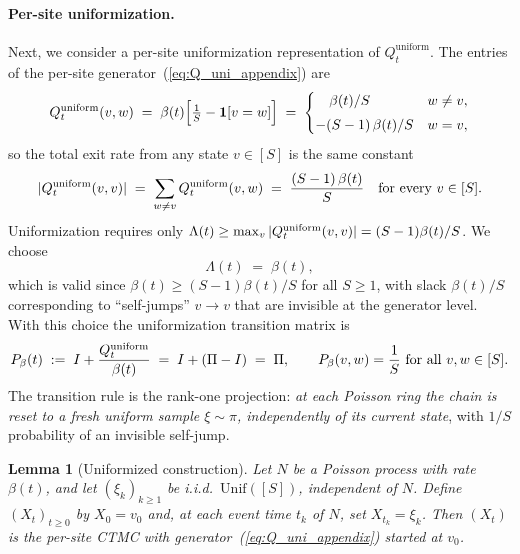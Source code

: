 \documentclass{article} %
\newtheorem{lemma}[theorem]{Lemma}
\def\eqref#1{equation~\ref{#1}}
\renewcommand{\eqref}[1]{\textup{(\ref{#1})}}
\newcommand{\Punif}{\Pi}
\begin{document}
\paragraph{Per-site uniformization.} Next, we consider a per-site uniformization representation of $Q^\mathrm{uniform}_t$. The entries of the per-site generator~\eqref{eq:Q_uni_appendix} are
\begin{equation}\label{eq:Q_entries}
  Q_t^{\rm uniform}(v, w) \;=\; \beta(t)\Big[\tfrac{1}{S} - \mathbf{1}[v=w]\Big]
  \;=\;
  \begin{cases}
    \;\;\;\,\beta(t)/S & w \neq v, \\[3pt]
    -(S-1)\,\beta(t)/S & w = v,
  \end{cases}
\end{equation}
so the total exit rate from any state $v \in [S]$ is the same constant
\begin{equation}\label{eq:exit_rate}
  |Q_t^{\rm uniform}(v,v)|
  \;=\; \sum_{w \neq v} Q_t^{\rm uniform}(v, w)
  \;=\; \frac{(S-1)\,\beta(t)}{S}
  \quad\text{for every } v \in [S].
\end{equation}
Uniformization requires only
$\Lambda(t) \ge \max_v |Q_t^{\rm uniform}(v,v)| = (S-1)\beta(t)/S$.
We choose
\begin{equation}\label{eq:choice_lambda}
  \Lambda(t) \;=\; \beta(t),
\end{equation}
which is valid since $\beta(t) \ge (S-1)\beta(t)/S$ for all $S \ge 1$,
with slack $\beta(t)/S$ corresponding to ``self-jumps'' $v \to v$ that
are invisible at the generator level. With this choice the
uniformization transition matrix is
\begin{equation}\label{eq:P_beta}
  P_\beta(t)
  \;:=\; I + \frac{Q_t^{\rm uniform}}{\beta(t)}
  \;=\; I + (\Punif - I)
  \;=\; \Punif,
  \qquad
  P_\beta(v, w) = \frac{1}{S} \text{ for all } v, w \in [S].
\end{equation}
The transition rule is the rank-one projection: \emph{at each Poisson
ring the chain is reset to a fresh uniform sample $\xi \sim \pi$,
independently of its current state}, with $1/S$ probability of an
invisible self-jump.

\begin{lemma}[Uniformized construction]
\label{lem:uniformization}
Let $N$ be a Poisson process with rate $\beta(t)$, and let
$(\xi_k)_{k \ge 1}$ be i.i.d.\ $\mathrm{Unif}([S])$, independent of $N$.
Define $(X_t)_{t \ge 0}$ by $X_0 = v_0$ and, at each event time $t_k$
of $N$, set $X_{t_k} = \xi_k$. Then $(X_t)$ is the per-site CTMC with
generator~\eqref{eq:Q_uni_appendix} started at $v_0$.
\end{lemma}
\end{document}
